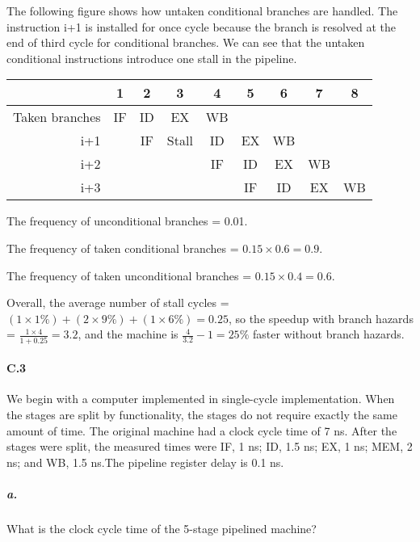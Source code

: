 \documentclass{article}
\begin{document}
The following figure shows how untaken conditional branches are handled. The instruction i+1 is installed for once cycle because the branch is resolved at the end of third cycle for conditional branches. We can see that the untaken conditional instructions introduce one stall in the pipeline.

\begin{table}[ht!]
\begin{center}
\begin{tabular}{r|c|c|c|c|c|c|c|c} %
    \toprule
    &\textbf{1}&\textbf{2}&\textbf{3}&\textbf{4}&\textbf{5}&\textbf{6}&\textbf{7}&\textbf{8}\\
    \hline
    Taken branches&IF&ID&EX&WB&&&&\\
    \hline
    i+1&&IF&Stall&ID&EX&WB&\\
    \hline
    i+2&&&&IF&ID&EX&WB\\
    \hline
    i+3&&&&&IF&ID&EX&WB\\
    \bottomrule
    \end{tabular}
\end{center}
\end{table}

The frequency of unconditional branches = 0.01.

The frequency of taken conditional branches = $0.15\times 0.6=0.9$.

The frequency of taken unconditional branches = $0.15\times 0.4=0.6$.

Overall, the average number of stall cycles = $(1\times 1\%)+(2\times 9\%)+(1\times 6\%)=0.25$, so the speedup with branch hazards = $\frac{1\times 4}{1+0.25}=3.2$, and the machine is $\frac{4}{3.2}-1=25\%$ faster without branch hazards.

\paragraph{C.3} We begin with a computer implemented in single-cycle implementation. When the stages are split by functionality, the stages do not require exactly the same amount of time. The original machine had a clock cycle time of 7 ns. After the stages were split, the measured times were IF, 1 ns; ID, 1.5 ns; EX, 1 ns; MEM, 2 ns; and WB, 1.5 ns.The pipeline register delay is 0.1 ns.

\subparagraph{a.} What is the clock cycle time of the 5-stage pipelined machine? 
\end{document}
